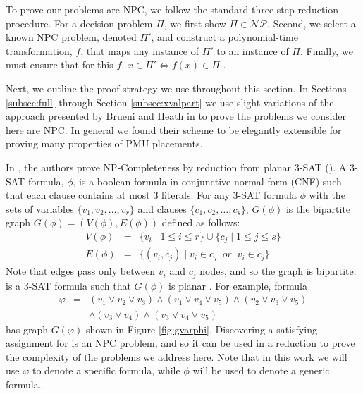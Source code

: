 To prove our problems are NPC, we follow the standard three-step reduction procedure. For a decision problem $\Pi$, we first show $\Pi\in\mathcal{NP}$. 
Second, we select a known NPC problem, denoted $\Pi'$, and construct a polynomial-time transformation, $f$, that maps any instance of $\Pi'$  to an instance of $\Pi$. 
Finally, we must ensure that for this $f$,  $x\in\Pi'\Leftrightarrow f(x)\in\Pi$ \cite{Garey79}.

Next, we outline the proof strategy we use throughout this section. In Sections  \ref{subsec:full} through Section \ref{subsec:xvalpart} we use slight variations of the approach presented
by Brueni and Heath in \cite{Brueni05} to prove the problems we consider here are NPC. In general we found their scheme to be elegantly extensible for proving many properties of PMU placements.

In \cite{Brueni05}, the authors prove NP-Completeness by reduction from planar 3-SAT (\sats). A 3-SAT formula, $\phi$, is a boolean formula in conjunctive normal form (CNF) such that each clause contains at most $3$ literals. For any 3-SAT formula $\phi$ with the sets of variables $\{v_1,v_2, \dots , v_r\}$ and clauses $\{c_1,c_2, \dots , c_s \}$, $G(\phi)$ is the bipartite graph $G(\phi)=(V(\phi),E(\phi))$ defined as follows:
\begin{eqnarray*}
 V(\phi) &= &\{v_i\; \vert\; 1 \leq i \leq r \} \cup \{c_j \;\vert\; 1 \leq j \leq s \} \\
 E(\phi) &=& \{ (v_i,c_j)\;\vert\; v_i \in c_j\;\; or \;\; \overline{v_i} \in c_j\}.
\end{eqnarray*}
Note that edges pass only between $v_i$ and $c_j$ nodes, and so the graph is bipartite.  \sat is a 3-SAT formula such that $G(\phi)$ is planar \cite{Lich82}. 
For example, \sat formula
\begin{eqnarray}
\varphi  &=& (\overline{v_1} \vee v_2 \vee v_3) \wedge (\overline{v_1} \vee \overline{v_4} \vee v_5) \wedge (\overline{v_2} \vee \overline{v_3} \vee \overline{v_5}) \nonumber\\
		 & & \wedge (v_3 \vee \overline{v_4}) \wedge  (\overline{v_3} \vee v_4 \vee \overline{v_5})
\label{eqn:varphi}
\end{eqnarray}
has graph $G(\varphi)$ shown in Figure \ref{fig:gvarphi}. Discovering a satisfying assignment for  \sat is an NPC problem, and so it can be used in a reduction to prove the complexity of the problems we address here. Note that in this work we will use $\varphi$ to denote a specific \sat formula, while $\phi$ will be used to denote a generic \sat formula.

